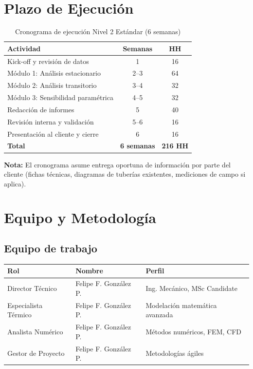 \documentclass[11pt,a4paper]{article}
\begin{document}
\newpage

\section{Plazo de Ejecución}

\begin{table}[H]
\centering
\caption{Cronograma de ejecución Nivel 2 Estándar (6 semanas)}
\begin{tabular}{@{}lcc@{}}
\toprule
\textbf{Actividad} & \textbf{Semanas} & \textbf{HH} \\
\midrule
Kick-off y revisión de datos & 1 & 16 \\
Módulo 1: Análisis estacionario & 2--3 & 64 \\
Módulo 2: Análisis transitorio & 3--4 & 32 \\
Módulo 3: Sensibilidad paramétrica & 4--5 & 32 \\
Redacción de informes & 5 & 40 \\
Revisión interna y validación & 5--6 & 16 \\
Presentación al cliente y cierre & 6 & 16 \\
\midrule
\textbf{Total} & \textbf{6 semanas} & \textbf{216 HH} \\
\bottomrule
\end{tabular}
\end{table}

\textbf{Nota:} El cronograma asume entrega oportuna de información por parte del cliente (fichas técnicas, diagramas de tuberías existentes, mediciones de campo si aplica).

\newpage

\section{Equipo y Metodología}

\subsection{Equipo de trabajo}

\begin{table}[H]
\centering
\begin{tabular}{@{}lll@{}}
\toprule
\textbf{Rol} & \textbf{Nombre} & \textbf{Perfil} \\
\midrule
Director Técnico & Felipe F. González P. & Ing. Mecánico, MSc Candidate \\
Especialista Térmico & Felipe F. González P. & Modelación matemática avanzada \\
Analista Numérico & Felipe F. González P. & Métodos numéricos, FEM, CFD \\
Gestor de Proyecto & Felipe F. González P. & Metodologías ágiles \\
\bottomrule
\end{tabular}
\end{table}
\end{document}
